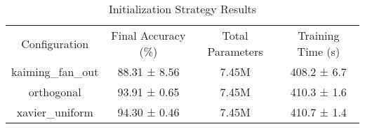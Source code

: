 \begin{table}
    \centering
    \begin{tabular}{cccc}
        Configuration & Final Accuracy (\%) & Total Parameters & Training Time (s) \\
        kaiming_fan_out & 88.31 ± 8.56 & 7.45M & 408.2 ± 6.7 \\
        orthogonal & 93.91 ± 0.65 & 7.45M & 410.3 ± 1.6 \\
        xavier_uniform & 94.30 ± 0.46 & 7.45M & 410.7 ± 1.4 \\
    \end{tabular}
    \caption{Initialization Strategy Results}
    \label{tab:init}
\end{table}